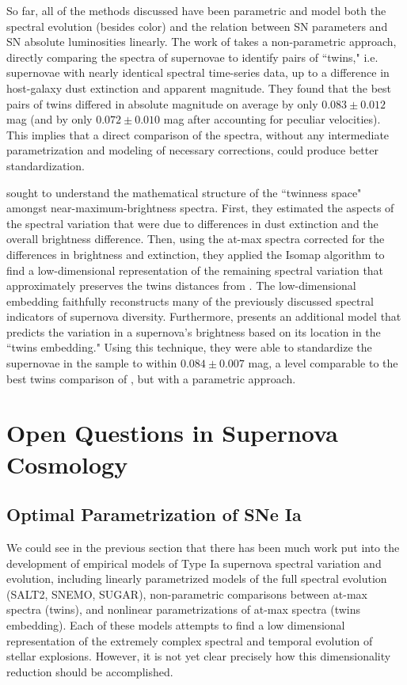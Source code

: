 So far, all of the methods discussed have been parametric and model both the spectral evolution (besides color) and the relation between SN parameters and SN absolute luminosities linearly. The work of \citet{fakhouri_improving_2015} takes a non-parametric approach, directly comparing the spectra of supernovae to identify pairs of ``twins," i.e. supernovae with nearly identical spectral time-series data, up to a difference in host-galaxy dust extinction and apparent magnitude. They found that the best pairs of twins differed in absolute magnitude on average by only $0.083 \pm 0.012$ mag (and by only $0.072 \pm 0.010$ mag after accounting for peculiar velocities). This implies that a direct comparison of the spectra, without any intermediate parametrization and modeling of necessary corrections, could produce better standardization.

\citet{boone_twins_2020a} sought to understand the mathematical structure of the ``twinness space" amongst near-maximum-brightness spectra. First, they estimated the aspects of the spectral variation that were due to differences in dust extinction and the overall brightness difference. Then, using the at-max spectra corrected for the differences in brightness and extinction, they applied the Isomap algorithm \citep{tenenbaum_global_2000} to find a low-dimensional representation of the remaining spectral variation that approximately preserves the twins distances from \citet{fakhouri_improving_2015}. The low-dimensional embedding faithfully reconstructs many of the previously discussed spectral indicators of supernova diversity. Furthermore, \citet{boone_twins_2020b} presents an additional model that predicts the variation in a supernova's brightness based on its location in the ``twins embedding." Using this technique, they were able to standardize the supernovae in the sample to within $0.084 \pm 0.007$ mag, a level comparable to the best twins comparison of \citet{fakhouri_improving_2015}, but with a parametric approach.

\section{Open Questions in Supernova Cosmology}
\subsection{Optimal Parametrization of SNe Ia}
We could see in the previous section that there has been much work put into the development of empirical models of Type Ia supernova spectral variation and evolution, including linearly parametrized models of the full spectral evolution (SALT2, SNEMO, SUGAR), non-parametric comparisons between at-max spectra (twins), and nonlinear parametrizations of at-max spectra (twins embedding). Each of these models attempts to find a low dimensional representation of the extremely complex spectral and temporal evolution of stellar explosions. However, it is not yet clear precisely how this dimensionality reduction should be accomplished.

